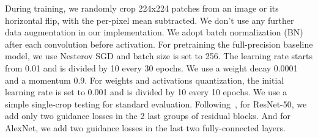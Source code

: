 \documentclass[10pt,twocolumn,letterpaper]{article}
\begin{document}
During training, we randomly crop 224x224 patches from an image or its horizontal flip, with the per-pixel mean subtracted. We don't use any further data augmentation in our implementation. We adopt batch normalization (BN)~\cite{ioffe2015batch} after each convolution before activation. For pretraining the full-precision baseline model, we use Nesterov SGD and batch size is set to 256. The learning rate starts from 0.01 and is divided by 10 every 30 epochs. We use a weight decay 0.0001 and a momentum 0.9. For weights and activations quantization, the initial learning rate is set to 0.001 and is divided by 10 every 10 epochs. We use a simple single-crop testing for standard evaluation. Following~\cite{zagoruyko2016paying}, for ResNet-50, we add only two guidance losses in the 2 last groups of residual blocks. And for AlexNet, we add two guidance losses in the last two fully-connected layers.



%
	 

	 

\small


\end{document}
